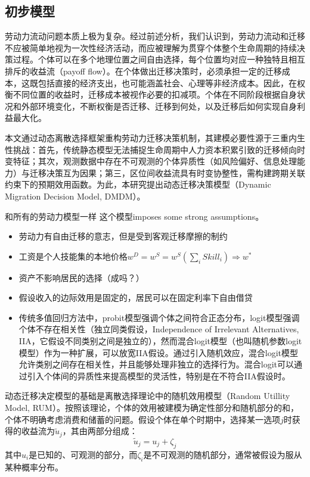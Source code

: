 \documentclass[a4paper,12pt]{article}
\begin{document}
\subsection{初步模型}

劳动力流动问题本质上极为复杂。经过前述分析，我们认识到，劳动力流动和迁移不应被简单地视为一次性经济活动，而应被理解为贯穿个体整个生命周期的持续决策过程。个体可以在多个地理位置之间自由选择，每个位置均对应一种独特且相互排斥的收益流（payoff flow）。在个体做出迁移决策时，必须承担一定的迁移成本，这既包括直接的经济支出，也可能涵盖社会、心理等非经济成本。因此，在权衡不同位置的收益时，迁移成本被视作必要的扣减项。个体在不同阶段根据自身状况和外部环境变化，不断权衡是否迁移、迁移到何处，以及迁移后如何实现自身利益最大化。

本文通过动态离散选择框架重构劳动力迁移决策机制，其建模必要性源于三重内生性挑战：首先，传统静态模型无法捕捉生命周期中人力资本积累引致的迁移倾向时变特征；其次，观测数据中存在不可观测的个体异质性（如风险偏好、信息处理能力）与迁移决策互为因果；第三，区位间收益流具有时变协整性，需构建跨期关联约束下的预期效用函数。为此，本研究提出动态迁移决策模型（Dynamic Migration Decision Model, DMDM）。

和所有的劳动力模型一样 这个模型imposes some strong assumptions。
\begin{itemize}
\item 劳动力有自由迁移的意志，但是受到客观迁移摩擦的制约
\item 工资是个人技能集的本地价格$w^{D}=w^{S}=w^{S}(\sum\limits_{i}Skill_{i})\Rightarrow w^{*}$
\item 资产不影响居民的选择（成吗？）
\item 假设收入的边际效用是固定的，居民可以在固定利率下自由借贷
\item 传统多值回归方法中，probit模型强调个体之间符合正态分布，logit模型强调个体不存在相关性（独立同类假设，Independence of Irrelevant Alternatives, IIA，它假设不同类别之间是独立的），然而混合logit模型（也叫随机参数logit模型）作为一种扩展，可以放宽IIA假设。通过引入随机效应，混合logit模型允许类别之间存在相关性，并且能够处理非独立的选择行为。混合logit可以通过引入个体间的异质性来提高模型的灵活性，特别是在不符合IIA假设时。
\end{itemize}

动态迁移决定模型的基础是离散选择理论中的随机效用模型（Random Utillity Model, RUM）。按照该理论，个体的效用被建模为确定性部分和随机部分的和，个体不明确考虑消费和储蓄的问题。假设个体在单个时期中，选择某一选项$j$时获得的收益流为$\tilde u_j$，其由两部分组成：
\begin{equation}
  \tilde u_j = u_j + \zeta_j
\end{equation}
其中$u_i$是已知的、可观测的部分，而$\zeta_i$是不可观测的随机部分，通常被假设为服从某种概率分布。
\end{document}
